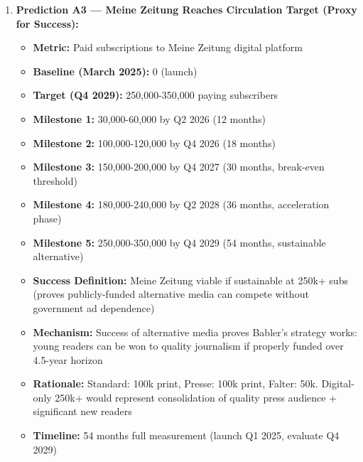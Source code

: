 \begin{enumerate}
\item \textbf{Prediction A3 — Meine Zeitung Reaches Circulation Target (Proxy for Success):}
  \begin{itemize}
  \item \textbf{Metric:} Paid subscriptions to Meine Zeitung digital platform
  \item \textbf{Baseline (March 2025):} 0 (launch)
  \item \textbf{Target (Q4 2029):} 250,000-350,000 paying subscribers
  \item \textbf{Milestone 1:} 30,000-60,000 by Q2 2026 (12 months)
  \item \textbf{Milestone 2:} 100,000-120,000 by Q4 2026 (18 months)
  \item \textbf{Milestone 3:} 150,000-200,000 by Q4 2027 (30 months, break-even threshold)
  \item \textbf{Milestone 4:} 180,000-240,000 by Q2 2028 (36 months, acceleration phase)
  \item \textbf{Milestone 5:} 250,000-350,000 by Q4 2029 (54 months, sustainable alternative)
  \item \textbf{Success Definition:} Meine Zeitung viable if sustainable at 250k+ subs
    (proves publicly-funded alternative media can compete without government ad dependence)
  \item \textbf{Mechanism:} Success of alternative media proves Babler's strategy works:
    young readers can be won to quality journalism if properly funded over 4.5-year horizon
  \item \textbf{Rationale:} Standard: 100k print, Presse: 100k print, Falter: 50k. Digital-only
    250k+ would represent consolidation of quality press audience + significant new readers
  \item \textbf{Timeline:} 54 months full measurement (launch Q1 2025, evaluate Q4 2029)
  \end{itemize}


\end{enumerate}
